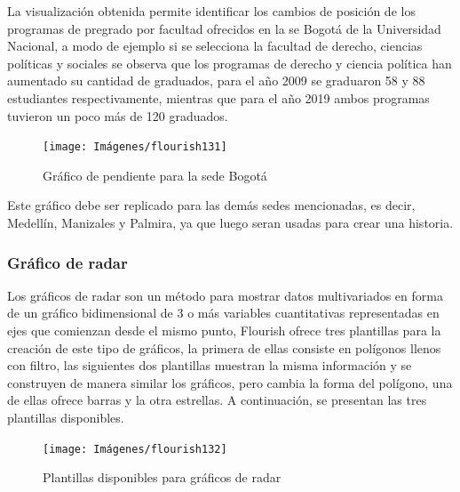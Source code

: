 \documentclass[
]{book}
\begin{document}
La visualización obtenida permite identificar los cambios de posición de los programas de pregrado por facultad ofrecidos en la se Bogotá de la Universidad Nacional, a modo de ejemplo si se selecciona la facultad de derecho, ciencias políticas y sociales se observa que los programas de derecho y ciencia política han aumentado su cantidad de graduados, para el año 2009 se graduaron 58 y 88 estudiantes respectivamente, mientras que para el año 2019 ambos programas tuvieron un poco más de 120 graduados.

\begin{figure}

{\centering \texttt{[image: Imágenes/flourish131]} 

}

\caption{Gráfico de pendiente para la sede Bogotá}\label{fig:pendientesedebogotaflourish-fig}
\end{figure}

Este gráfico debe ser replicado para las demás sedes mencionadas, es decir, Medellín, Manizales y Palmira, ya que luego seran usadas para crear una historia.

\hypertarget{graficoradarflourish}{%
\subsubsection{Gráfico de radar}\label{graficoradarflourish}}

Los gráficos de radar son un método para mostrar datos multivariados en forma de un gráfico bidimensional de 3 o más variables cuantitativas representadas en ejes que comienzan desde el mismo punto, Flourish ofrece tres plantillas para la creación de este tipo de gráficos, la primera de ellas consiste en polígonos llenos con filtro, las siguientes dos plantillas muestran la misma información y se construyen de manera similar los gráficos, pero cambia la forma del polígono, una de ellas ofrece barras y la otra estrellas. A continuación, se presentan las tres plantillas disponibles.

\begin{figure}

{\centering \texttt{[image: Imágenes/flourish132]} 

}

\caption{Plantillas disponibles para gráficos de radar}\label{fig:plantillasradarflourish-fig}
\end{figure}
\end{document}
